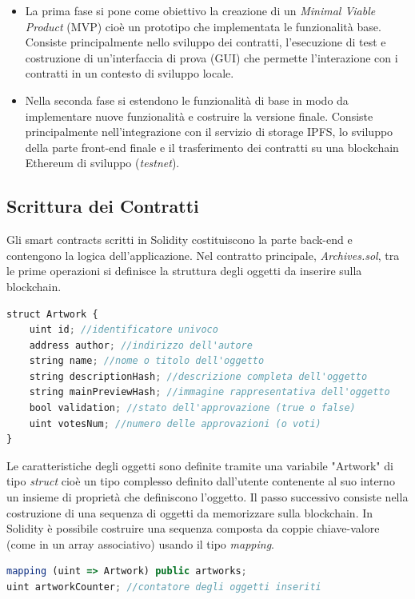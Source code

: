 \begin{itemize}

\item La prima fase si pone come obiettivo la creazione di un \emph{Minimal Viable Product} (MVP) cioè un prototipo che  implementata le funzionalità base. Consiste principalmente nello sviluppo dei contratti, l'esecuzione di test e costruzione di un'interfaccia di prova (GUI) che permette l'interazione con i contratti in un contesto di sviluppo locale.

\item Nella seconda fase si estendono le funzionalità di base in modo da implementare nuove funzionalità e costruire la versione finale. Consiste principalmente nell'integrazione con il servizio di storage IPFS, lo sviluppo della parte front-end finale e il trasferimento dei contratti su una blockchain Ethereum di sviluppo (\emph{testnet}).

\end{itemize}

\subsection{Scrittura dei Contratti}

Gli smart contracts scritti in Solidity costituiscono la parte back-end e contengono la logica dell'applicazione. Nel contratto principale, \emph{Archives.sol}, tra le prime operazioni si definisce la struttura degli oggetti da inserire sulla blockchain.
\\
\begin{lstlisting}[caption={Struttura degli oggetti},language=JavaScript]
struct Artwork {
    uint id; //identificatore univoco
    address author; //indirizzo dell'autore
    string name; //nome o titolo dell'oggetto
    string descriptionHash; //descrizione completa dell'oggetto
    string mainPreviewHash; //immagine rappresentativa dell'oggetto
    bool validation; //stato dell'approvazione (true o false)
    uint votesNum; //numero delle approvazioni (o voti)
}
\end{lstlisting}

Le caratteristiche degli oggetti sono definite tramite una variabile "Artwork" di tipo \emph{struct} cioè un tipo complesso definito dall'utente contenente al suo interno un insieme di proprietà che definiscono l'oggetto. Il passo successivo consiste nella costruzione di una sequenza di oggetti da memorizzare sulla blockchain. In Solidity è possibile costruire una sequenza composta da coppie chiave-valore (come in un array associativo) usando il tipo \emph{mapping}.
\\
\begin{lstlisting}[caption={Associazione chiave-valore},language=JavaScript]
mapping (uint => Artwork) public artworks;
uint artworkCounter; //contatore degli oggetti inseriti 
\end{lstlisting}

